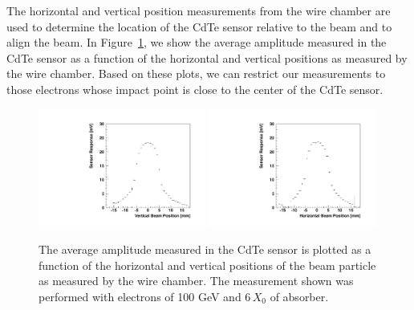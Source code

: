 The horizontal and vertical position measurements from the wire chamber are used to determine the location
of the CdTe sensor relative to the beam and to align the beam. In 
Figure~\ref{fig:BeamSensorPosition}, we show the average amplitude measured in the
CdTe sensor as a function of the horizontal and vertical positions as measured by the wire chamber. Based
on these plots, we can restrict our measurements to those electrons whose impact point is close
to the center of the CdTe sensor.

\begin{figure}[htbp] 
\centering
\includegraphics[width=0.49\textwidth]{figures/CdTeProfile_X.pdf} 
\includegraphics[width=0.49\textwidth]{figures/CdTeProfile_Y.pdf} 
\caption{The average amplitude measured in the CdTe sensor is plotted as a function of 
the horizontal and vertical positions of the beam particle as measured by the wire chamber. The measurement shown was performed with electrons of 100 GeV and $6\, X_0$ of absorber.} 
\label{fig:BeamSensorPosition} 
\end{figure} 

